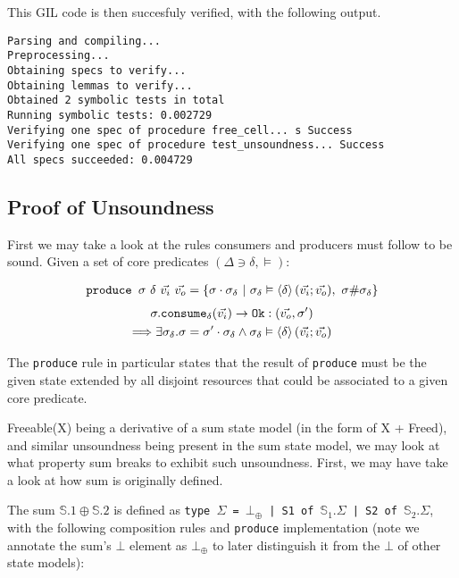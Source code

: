 \documentclass[,a4paper,oneside]{article}
\newcommand{\code}[1]{\texttt{#1}}
\newcommand{\mmdl}{\ensuremath{\mathbb S}}
\newcommand{\rarr}{\ensuremath{\rightarrow}}
\begin{document}
This GIL code is then succesfuly verified, with the following output.

\begin{verbatim}
Parsing and compiling...
Preprocessing...
Obtaining specs to verify...
Obtaining lemmas to verify...
Obtained 2 symbolic tests in total
Running symbolic tests: 0.002729
Verifying one spec of procedure free_cell... s Success
Verifying one spec of procedure test_unsoundness... Success
All specs succeeded: 0.004729	
\end{verbatim}


\subsection{Proof of Unsoundness}

First we may take a look at the rules consumers and producers must follow to be sound. Given a set of core predicates $(\Delta\ni\delta, \vDash)$:

\newcommand{\ins}[0]{\vec{v_i}}
\newcommand{\outs}[0]{\vec{v_o}}

\begin{gather*}
	\code{produce }\sigma ~\delta ~\ins~\outs = \{\sigma \cdot \sigma_\delta ~|~\sigma_\delta \vDash \corepred{$\delta$}{\ins}{\outs}, ~\sigma\#\sigma_\delta\}
\end{gather*}
\begin{gather*}
	\sigma.\code{consume}_\delta(\ins)\rarr \code{Ok}:(\outs,\sigma')\\
	\Longrightarrow\exists\sigma_\delta .\sigma=\sigma'\cdot \sigma_\delta\land \sigma_\delta\vDash\corepred{$\delta$}{\ins}{\outs}
\end{gather*}

The \code{produce} rule in particular states that the result of \code{produce} must be the given state extended by all disjoint resources that could be associated to a given core predicate.

Freeable(X) being a derivative of a sum state model (in the form of X + Freed), and similar unsoundness being present in the sum state model, we may look at what property sum breaks to exhibit such unsoundness. First, we may have take a look at how sum is originally defined.

The sum $\mmdl.1 \oplus \mmdl.2$ is defined as \code{type $\Sigma$ = $\bot_\oplus$ | S1 of $\mathbb S_1.\Sigma$ | S2 of $\mathbb S_2.\Sigma$}, with the following composition rules and \code{produce} implementation (note we annotate the sum's $\bot$ element as $\bot_\oplus$ to later distinguish it from the $\bot$ of other state models):
\end{document}
